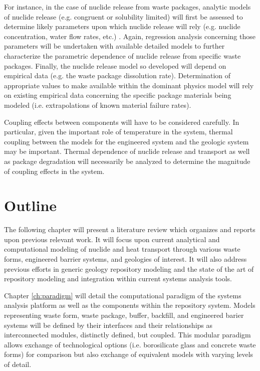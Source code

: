 For instance, in the case of nuclide release from waste packages, 
analytic models of nuclide release (e.g.  congruent or solubility 
limited) will first be assessed to determine likely parameters upon 
which nuclide release will rely (e.g.  nuclide concentration, water 
flow rates, etc.) \cite{kawasaki_congruent_2004}.  Again, regression 
analysis concerning those parameters will be undertaken with available 
detailed models to further characterize the parametric dependence of 
nuclide release from specific waste packages.  Finally, the nuclide 
release model so developed will depend on empirical data (e.g. the 
waste package dissolution rate).  Determination of appropriate values 
to make available within the dominant physics model will rely on 
existing empirical data concerning the specific package materials 
being modeled (i.e.  extrapolations of known material failure rates).  

Coupling effects between components will have to be considered 
carefully.  In particular, given the important role of temperature in 
the system, thermal coupling between the models for the engineered 
system and the geologic system may be important. Thermal dependence of 
nuclide release and transport as well as package degradation will 
necessarily be analyzed to determine the magnitude of coupling effects 
in the system.


\section{Outline}

The following chapter will present a literature review which organizes 
and reports upon previous relevant work. It will focus upon current 
analytical and computational modeling of nuclide and heat transport 
through various waste forms, engineered barrier systems, and geologies 
of interest. It will also address previous efforts in generic geology 
repository modeling and the state of the art of repository modeling 
and integration within current systems analysis tools. 

Chapter \ref{ch:paradigm} will detail the computational paradigm of 
the \Cyclus systems analysis platform as well as the components within 
the repository system. Models
representing waste form, waste package, buffer, backfill, and 
engineered barier systems will be defined by their interfaces and 
their relationships as interconnected modules, distinctly defined, but 
coupled. This modular paradigm allows exchange  of technological 
options (i.e. borosilicate glass and concrete waste forms) for 
comparison but also exchange of equivalent models with varying levels 
of detail.

